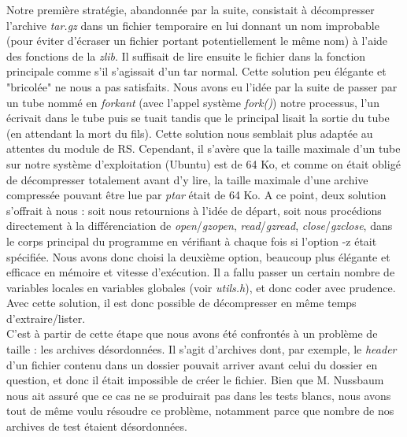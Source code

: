 \documentclass[12pt, a4paper]{report}
\begin{document}
\hspace{0.5cm}Notre première stratégie, abandonnée par la suite, consistait à décompresser l'archive \textit{tar.gz} dans un fichier temporaire en lui donnant un nom improbable (pour éviter d'écraser un fichier portant potentiellement le même nom) à l'aide des fonctions de la \textit{zlib}. Il suffisait de lire ensuite le fichier dans la fonction principale comme s'il s'agissait d'un tar normal. Cette solution peu élégante et "bricolée" ne nous a pas satisfaits. Nous avons eu l'idée par la suite de passer par un tube nommé en \textit{forkant} (avec l'appel système \textit{fork()}) notre processus, l'un écrivait dans le tube puis se tuait tandis que le principal lisait la sortie du tube (en attendant la mort du fils). Cette solution nous semblait plus adaptée au attentes du module de RS. Cependant, il s'avère que la taille maximale d'un tube sur notre système d'exploitation (Ubuntu) est de 64 Ko, et comme on était obligé de décompresser totalement avant d'y lire, la taille maximale d'une archive compressée pouvant être lue par \textit{ptar} était de 64 Ko. 
A ce point, deux solution s'offrait à nous : soit nous retournions à l'idée de départ, soit nous procédions directement à la différenciation de \textit{open}/\textit{gzopen}, \textit{read}/\textit{gzread}, \textit{close}/\textit{gzclose}, dans le corps principal du programme en vérifiant à chaque fois si l'option -z était spécifiée. Nous avons donc choisi la deuxième option, beaucoup plus élégante et efficace en mémoire et vitesse d'exécution. Il a fallu passer un certain nombre de variables locales en variables globales (voir \textit{utils.h}), et donc coder avec prudence. Avec cette solution, il est donc possible de décompresser en même temps d'extraire/lister.\\

\hspace{0.5cm}C'est à partir de cette étape que nous avons été confrontés à un problème de taille : les archives désordonnées. Il s'agit d'archives dont, par exemple, le \textit{header} d'un fichier contenu dans un dossier pouvait arriver avant celui du dossier en question, et donc il était impossible de créer le fichier. Bien que M. Nussbaum nous ait assuré que ce cas ne se produirait pas dans les tests blancs, nous avons tout de même voulu résoudre ce problème, notamment parce que nombre de nos archives de test étaient désordonnées.\\
\end{document}
